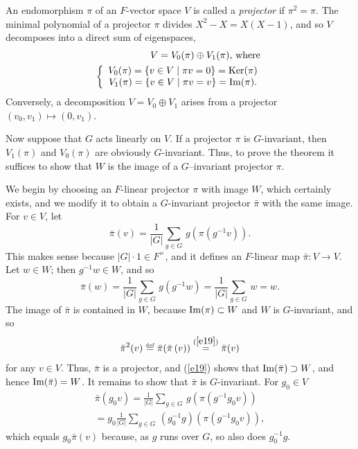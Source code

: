 \documentclass[a4paper,11pt,final,openany]{memoir}%
\theoremstyle{nonumberplain}
\begin{document}
An endomorphism $\pi$ of an $F$-vector space $V$ is called a%
\emph{projector} if $\pi^{2}=\pi$. The minimal polynomial of a projector $\pi$
divides $X^{2}-X=X(X-1)$, and so $V$ decomposes into a direct sum of
eigenspaces,%
\begin{align*}
V=V_{0}(\pi)\oplus V_{1}(\pi) \text{, where }\\
\left\{
\begin{array}
[c]{c}%
V_{0}(\pi)=\{v\in V\mid\pi v=0\}=\Ker(\pi)\\
V_{1}(\pi)=\{v\in V\mid\pi v=v\}=\im(\pi).
\end{array}
\right.
\end{align*}
Conversely, a decomposition $V=V_{0}\oplus V_{1}$ arises from a projector
$(v_{0},v_{1})\mapsto(0,v_{1})$.

Now suppose that $G$ acts linearly on $V$. If a projector $\pi$ is
$G$-invariant, then $V_{1}(\pi)$ and $V_{0}(\pi)$ are obviously $G$-invariant.
Thus, to prove the theorem it suffices to show that $W$ is the image of a
$G$--invariant projector $\pi$.

We begin by choosing an $F$-linear projector $\pi$ with image $W$, which
certainly exists, and we modify it to obtain a $G$-invariant projector
$\bar{\pi}$ with the same image. For $v\in V$, let%
\[
\bar{\pi}(v)=\frac{1}{|G|}\sum_{g\in G}\,g\left(  \pi(g^{-1}v)\right)  .
\]
This makes sense because $|G|\cdot1\in F^{\times}$, and it defines an
$F$-linear map $\bar{\pi}\colon V\rightarrow V$. Let $w\in W$; then
$g^{-1}w\in W$, and so%
\begin{equation}
\bar{\pi}(w)=\frac{1}{|G|}\sum_{g\in G}\,g(g^{-1}w)=\frac{1}{|G|}\sum_{g\in
G}\,w=w. \label{e19}%
\end{equation}
The image of $\bar{\pi}$ is contained in $W$, because $\operatorname{Im}(\pi)\subset W$ and
$W$ is $G$-invariant, and so
\[
\bar{\pi}^{2}(v)\overset{\df}{=}\bar{\pi}(\bar{\pi}\left(
v)\right)  \overset{(\ref{e19})}{=}\bar{\pi}(v)
\]
for any $v\in V$. Thus, $\bar{\pi}$ is a projector, and (\ref{e19}) shows that
$\operatorname{Im}(\bar{\pi})\supset W$, and hence $\operatorname{Im}(\bar{\pi})=W$. It remains to show
that $\bar{\pi}$ is $G$-invariant. For $g_{0}\in V$
\begin{align*}
\bar{\pi}(g_{0}v)=\frac{1}{|G|}\sum_{g\in G}\,g\left(  \pi(g^{-1}%
g_{0}v)\right)  \\
=g_{0}\frac{1}{|G|}\sum_{g\in G}\,(g_{0}^{-1}g)\left(
\pi(g^{-1}g_{0}v)\right)  ,
\end{align*}
which equals $g_{0}\bar{\pi}\left(  v\right)  $ because, as $g$ runs over $G$,
so also does $g_{0}^{-1}g$.
\end{document}
